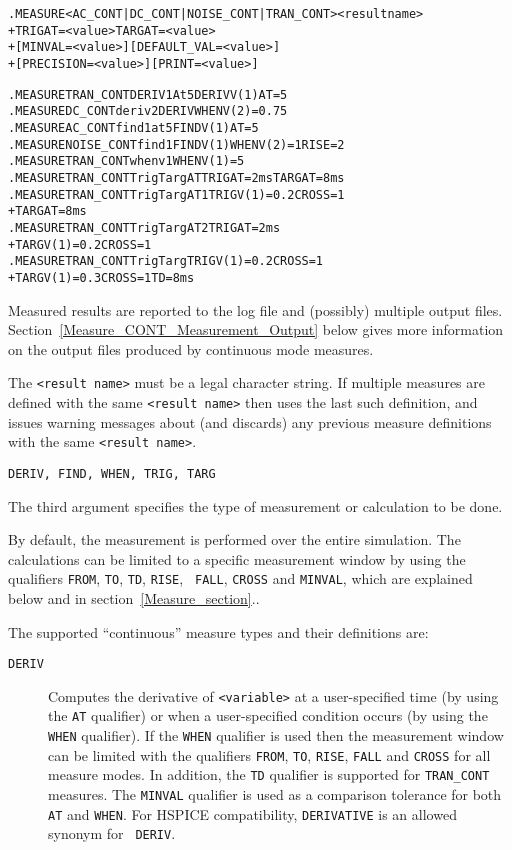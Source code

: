 \begin{Command}
\begin{alltt}
.MEASURE <AC_CONT|DC_CONT|NOISE_CONT|TRAN_CONT> <result name>
+ TRIG AT=<value> TARG AT=<value> 
+ [MINVAL=<value>] [DEFAULT_VAL=<value>]
+ [PRECISION=<value>] [PRINT=<value>]

\end{alltt}

\examples
\begin{alltt}
.MEASURE TRAN_CONT DERIV1At5 DERIV V(1) AT=5
.MEASURE DC_CONT deriv2 DERIV WHEN V(2)=0.75
.MEASURE AC_CONT find1at5 FIND V(1) AT=5
.MEASURE NOISE_CONT find1 FIND V(1) WHEN V(2)=1 RISE=2
.MEASURE TRAN_CONT whenv1 WHEN V(1)=5
.MEASURE TRAN_CONT TrigTargAT TRIG AT=2ms TARG AT=8ms
.MEASURE TRAN_CONT TrigTargAT1 TRIG V(1)=0.2 CROSS=1
+ TARG AT=8ms
.MEASURE TRAN_CONT TrigTargAT2 TRIG AT=2ms
+ TARG V(1)=0.2 CROSS=1
.MEASURE TRAN_CONT TrigTarg TRIG V(1)=0.2 CROSS=1
+ TARG V(1)=0.3 CROSS=1 TD=8ms
\end{alltt}

\arguments

\begin{Arguments}

Measured results are reported to the log file and (possibly) multiple
output files. Section~\ref{Measure_CONT_Measurement_Output} below gives more
information on the output files produced by continuous mode measures.

The \texttt{<result name>} must be a legal \Xyce{} character string.
If multiple measures are defined with the same \texttt{<result name>} then
\Xyce{} uses the last such definition, and issues warning messages about
(and discards) any previous measure definitions with the same
\texttt{<result name>}.


\texttt{DERIV, FIND, WHEN, TRIG, TARG}

The third argument specifies the type of measurement or calculation to
be done.

By default, the measurement is performed over the entire simulation.
The calculations can be limited to a specific measurement window by
using the qualifiers {\tt FROM}, {\tt TO}, {\tt TD}, {\tt RISE}, {\tt
FALL}, {\tt CROSS} and {\tt MINVAL}, which are explained below and in
section~\ref{Measure_section}..

The supported ``continuous'' measure types and their definitions are:

\begin{description}
 \item[\tt DERIV] Computes the derivative of {\tt <variable>} at a
    user-specified time (by using the {\tt AT} qualifier) or when a
    user-specified condition occurs (by using the {\tt WHEN}
    qualifier). If the {\tt WHEN} qualifier is used then the
    measurement window can be limited with the qualifiers {\tt FROM},
    {\tt TO}, {\tt RISE}, {\tt FALL} and {\tt CROSS} for all measure
    modes.  In addition, the {\tt TD} qualifier is supported for
    {\tt TRAN\_CONT} measures. The {\tt MINVAL} qualifier is used as a
    comparison tolerance for both {\tt AT} and {\tt WHEN}.  For HSPICE
    compatibility, {\tt DERIVATIVE} is an allowed synonym for {\tt
    DERIV}.


\end{description}
\end{Arguments}
\end{Command}
